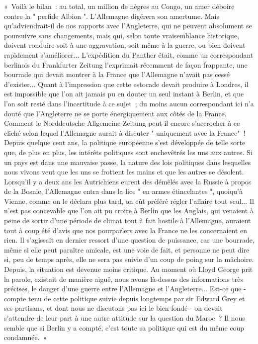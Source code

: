 \documentclass[french,twoside]{book} %
\newenvironment{quoteblock}%
  {\begin{quoting}}
  {\end{quoting}}
\newenvironment{quotebar}{%
    \def\FrameCommand{{\color{rubric!10!}\vrule width 0.5em} \hspace{0.9em}}%
    \def\OuterFrameSep{\itemsep} %
    \MakeFramed {\advance\hsize-\width \FrameRestore}
  }%
  {%
    \endMakeFramed
  }
\renewenvironment{quoteblock}%
  {%
    \savenotes
    \setstretch{0.9}
    \normalfont
    \begin{quotebar}
  }
  {%
    \end{quotebar}
    \spewnotes
  }
\begin{document}
\begin{quoteblock}
 \noindent « Voilà le bilan : au total, un million de nègres au Congo, un amer déboire contre la " perfide Albion ". L'Allemagne digérera son amertume. Mais qu’adviendrait-il de nos rapports avec l’Angleterre, qui ne peuvent absolument se poursuivre sans changements, mais qui, selon toute vraisemblance historique, doivent conduire soit à une aggravation, soit même à la guerre, ou bien doivent rapidement s’améliorer... L'expédition du Panther était, comme un correspondant berlinois du Frankfurter Zeitung l’exprimait récemment de façon frappante, une bourrade qui devait montrer à la France que l’Allemagne n’avait pas cessé d’exister... Quant à l’impression que cette estocade devait produire à Londres, il est impossible que l’on ait jamais pu en douter un seul instant à Berlin, et que l’on soit resté dans l’incertitude à ce sujet ; du moins aucun correspondant ici n’a douté que l’Angleterre ne se porte énergiquement aux côtés de la France. Comment le Norddeutsche Allgemeine Zeitung peut-il encore s’accrocher à ce cliché selon  lequel l’Allemagne aurait à discuter " uniquement avec la France" ! Depuis quelque cent ans, la politique européenne s’est développée de telle sorte que, de plus en plus, les intérêts politiques sont enchevêtrés les uns aux autres. Si un pays est dans une mauvaise passe, la nature des lois politiques dans lesquelles nous vivons veut que les uns se frottent les mains et que les autres se désolent. Lorsqu’il y a deux ans les Autrichiens eurent des démêlés avec la Russie à propos de la Bosnie, l’Allemagne entra dans la lice " en armes étincelantes ", quoiqu’à Vienne, comme on le déclara plus tard, on eût préféré régler l’affaire tout seul... Il n’est pas concevable que l’on ait pu croire à Berlin que les Anglais, qui venaient à peine de sortir d’une période de climat tout à fait hostile à l’Allemagne, auraient tout à coup été d’avis que nos pourparlers avec la France ne les concernaient en rien. Il s’agissait en dernier ressort d’une question de puissance, car une bourrade, même si elle peut paraître amicale, est une voie de fait, et personne ne peut dire si, peu de temps après, elle ne sera pas suivie d’un coup de poing sur la mâchoire. Depuis, la situation est devenue moins critique. Au moment où Lloyd George prit la parole, existait de manière aiguë, nous avons là-dessus des informations très précises, le danger d’une guerre entre l’Allemagne et l’Angleterre... Est-ce que - compte tenu de cette politique suivie depuis longtemps par sir Edward Grey et ses partisans, et dont nous ne discutons pas ici le bien-fondé - on devait s’attendre de leur part à une autre attitude sur la question du Maroc ? Il nous semble que si Berlin y a compté, c’est toute sa politique qui est du même coup condamnée. »
\end{quoteblock}
\end{document}
